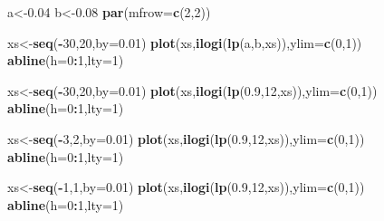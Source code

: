 \documentclass[
]{book}
\newenvironment{Shaded}{\begin{snugshade}}{\end{snugshade}}
\newcommand{\DataTypeTok}[1]{\textcolor[rgb]{0.13,0.29,0.53}{#1}}
\newcommand{\DecValTok}[1]{\textcolor[rgb]{0.00,0.00,0.81}{#1}}
\newcommand{\FloatTok}[1]{\textcolor[rgb]{0.00,0.00,0.81}{#1}}
\newcommand{\KeywordTok}[1]{\textcolor[rgb]{0.13,0.29,0.53}{\textbf{#1}}}
\newcommand{\NormalTok}[1]{#1}
\newcommand{\OperatorTok}[1]{\textcolor[rgb]{0.81,0.36,0.00}{\textbf{#1}}}
\begin{document}
\begin{Shaded}
\begin{Highlighting}[]
\NormalTok{a<-}\FloatTok{0.04}
\NormalTok{b<-}\FloatTok{0.08}
\KeywordTok{par}\NormalTok{(}\DataTypeTok{mfrow=}\KeywordTok{c}\NormalTok{(}\DecValTok{2}\NormalTok{,}\DecValTok{2}\NormalTok{))}

\NormalTok{xs<-}\KeywordTok{seq}\NormalTok{(}\OperatorTok{-}\DecValTok{30}\NormalTok{,}\DecValTok{20}\NormalTok{,}\DataTypeTok{by=}\FloatTok{0.01}\NormalTok{)}
\KeywordTok{plot}\NormalTok{(xs,}\KeywordTok{ilogi}\NormalTok{(}\KeywordTok{lp}\NormalTok{(a,b,xs)),}\DataTypeTok{ylim=}\KeywordTok{c}\NormalTok{(}\DecValTok{0}\NormalTok{,}\DecValTok{1}\NormalTok{))}
\KeywordTok{abline}\NormalTok{(}\DataTypeTok{h=}\DecValTok{0}\OperatorTok{:}\DecValTok{1}\NormalTok{,}\DataTypeTok{lty=}\DecValTok{1}\NormalTok{)}


\NormalTok{xs<-}\KeywordTok{seq}\NormalTok{(}\OperatorTok{-}\DecValTok{30}\NormalTok{,}\DecValTok{20}\NormalTok{,}\DataTypeTok{by=}\FloatTok{0.01}\NormalTok{)}
\KeywordTok{plot}\NormalTok{(xs,}\KeywordTok{ilogi}\NormalTok{(}\KeywordTok{lp}\NormalTok{(}\FloatTok{0.9}\NormalTok{,}\DecValTok{12}\NormalTok{,xs)),}\DataTypeTok{ylim=}\KeywordTok{c}\NormalTok{(}\DecValTok{0}\NormalTok{,}\DecValTok{1}\NormalTok{))}
\KeywordTok{abline}\NormalTok{(}\DataTypeTok{h=}\DecValTok{0}\OperatorTok{:}\DecValTok{1}\NormalTok{,}\DataTypeTok{lty=}\DecValTok{1}\NormalTok{)}


\NormalTok{xs<-}\KeywordTok{seq}\NormalTok{(}\OperatorTok{-}\DecValTok{3}\NormalTok{,}\DecValTok{2}\NormalTok{,}\DataTypeTok{by=}\FloatTok{0.01}\NormalTok{)}
\KeywordTok{plot}\NormalTok{(xs,}\KeywordTok{ilogi}\NormalTok{(}\KeywordTok{lp}\NormalTok{(}\FloatTok{0.9}\NormalTok{,}\DecValTok{12}\NormalTok{,xs)),}\DataTypeTok{ylim=}\KeywordTok{c}\NormalTok{(}\DecValTok{0}\NormalTok{,}\DecValTok{1}\NormalTok{))}
\KeywordTok{abline}\NormalTok{(}\DataTypeTok{h=}\DecValTok{0}\OperatorTok{:}\DecValTok{1}\NormalTok{,}\DataTypeTok{lty=}\DecValTok{1}\NormalTok{)}


\NormalTok{xs<-}\KeywordTok{seq}\NormalTok{(}\OperatorTok{-}\DecValTok{1}\NormalTok{,}\DecValTok{1}\NormalTok{,}\DataTypeTok{by=}\FloatTok{0.01}\NormalTok{)}
\KeywordTok{plot}\NormalTok{(xs,}\KeywordTok{ilogi}\NormalTok{(}\KeywordTok{lp}\NormalTok{(}\FloatTok{0.9}\NormalTok{,}\DecValTok{12}\NormalTok{,xs)),}\DataTypeTok{ylim=}\KeywordTok{c}\NormalTok{(}\DecValTok{0}\NormalTok{,}\DecValTok{1}\NormalTok{))}
\KeywordTok{abline}\NormalTok{(}\DataTypeTok{h=}\DecValTok{0}\OperatorTok{:}\DecValTok{1}\NormalTok{,}\DataTypeTok{lty=}\DecValTok{1}\NormalTok{)}
\end{Highlighting}
\end{Shaded}
\end{document}
